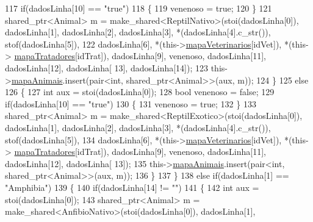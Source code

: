\begin{DoxyCode}
117                     \textcolor{keywordflow}{if}(dadosLinha[10] == \textcolor{stringliteral}{"true"})
118                     \{
119                         venenoso = \textcolor{keyword}{true};
120                     \}
121                     shared\_ptr<Animal> m = make\_shared<ReptilNativo>(stoi(dadosLinha[0]), dadosLinha[1], 
      dadosLinha[2], dadosLinha[3], *(dadosLinha[4].c\_str()), stof(dadosLinha[5]),
122                     dadosLinha[6], *(this->\hyperlink{classPetFera_a2bed2112a627bbdb3c0338654330a1ab}{mapaVeterinarios}[idVet]), *(this->
      \hyperlink{classPetFera_ac85920fc6c1471743838e6fe4444304d}{mapaTratadores}[idTrat]), dadosLinha[9], venenoso, dadosLinha[11], dadosLinha[12], dadosLinha[
      13], dadosLinha[14]);
123                     this->\hyperlink{classPetFera_ab0ba5fe6332bcffdabb7b03001280697}{mapaAnimais}.insert(pair<\textcolor{keywordtype}{int}, shared\_ptr<Animal>>(aux, m));
124                 \}
125                 \textcolor{keywordflow}{else}
126                 \{
127                     \textcolor{keywordtype}{int} aux = stoi(dadosLinha[0]);
128                     \textcolor{keywordtype}{bool} venenoso = \textcolor{keyword}{false};
129                     \textcolor{keywordflow}{if}(dadosLinha[10] == \textcolor{stringliteral}{"true"})
130                     \{
131                         venenoso = \textcolor{keyword}{true};
132                     \}
133                     shared\_ptr<Animal> m = make\_shared<ReptilExotico>(stoi(dadosLinha[0]), dadosLinha[1], 
      dadosLinha[2], dadosLinha[3], *(dadosLinha[4].c\_str()), stof(dadosLinha[5]),
134                     dadosLinha[6], *(this->\hyperlink{classPetFera_a2bed2112a627bbdb3c0338654330a1ab}{mapaVeterinarios}[idVet]), *(this->
      \hyperlink{classPetFera_ac85920fc6c1471743838e6fe4444304d}{mapaTratadores}[idTrat]), dadosLinha[9], venenoso, dadosLinha[11], dadosLinha[12], dadosLinha[
      13]);
135                     this->\hyperlink{classPetFera_ab0ba5fe6332bcffdabb7b03001280697}{mapaAnimais}.insert(pair<\textcolor{keywordtype}{int}, shared\_ptr<Animal>>(aux, m));
136                 \}
137             \}
138             \textcolor{keywordflow}{else} \textcolor{keywordflow}{if}(dadosLinha[1] == \textcolor{stringliteral}{"Amphibia"})
139             \{
140                 \textcolor{keywordflow}{if}(dadosLinha[14] != \textcolor{stringliteral}{""})
141                 \{
142                     \textcolor{keywordtype}{int} aux = stoi(dadosLinha[0]);
143                     shared\_ptr<Animal> m = make\_shared<AnfibioNativo>(stoi(dadosLinha[0]), dadosLinha[1], 

\end{DoxyCode}
